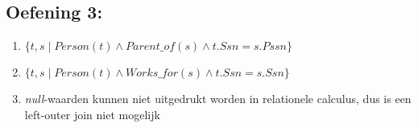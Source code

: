 \documentclass[../Oefenzitting5.tex]{subfiles}
\begin{document}
	\subsection{Oefening 3:}
	\begin{enumerate}
		\item
			$ \{ t, s \mid Person(t) \wedge Parent\_of(s) \wedge t.Ssn = s.Pssn\} $

		\item
			$ \{ t, s \mid Person(t) \wedge Works\_for(s) \wedge t.Ssn = s.Ssn \} $
			
		\item
			\emph{null}-waarden kunnen niet uitgedrukt worden in relationele calculus, dus is een left-outer join niet mogelijk
		
	\end{enumerate}
\end{document}
